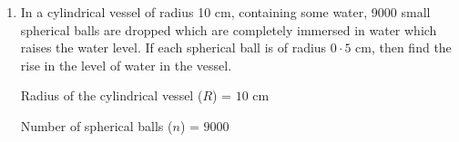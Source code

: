 \begin{enumerate}[label=\thesubsection.\arabic*, ref=\thesubsection.\theenumi]
	
	
	\begin{enumerate}
		\item Find $\frac{N}{2}$:
		\begin{center}
		$\frac{N}{2} = \frac{45}{2} = 22.5$
		\end{center}
		\item The cumulative frequency just greater than $22.5$ is $28$, which corresponds to the median class \textbf{100--140}.
		\item Values for the formula:
		\begin{itemize}
			\item Lower limit of median class ($l$) = $100$
			
			\item Cumulative frequency of preceding class ($cf$) = $12$
			
			\item Frequency of median class ($f$) = $16$
			
			\item Class width ($h$) = $40$
		\end{itemize}
	\end{enumerate}
	
	Apply the Median formula:
	\begin{align}
	\text{Median} = l + \left( \frac{\frac{N}{2} - cf}{f} \right) \times h
	\end{align}
	\begin{align}	
	\text{Median} = 100 + \left( \frac{22.5 - 12}{16} \right) \times 40
	\end{align}
	$$
	\text{Median} = 100 + \left( \frac{10.5}{16} \right) \times 40 = 100 + \frac{10.5 \times 5}{2} = 100 + \frac{52.5}{2} = 100 + 26.25 = 126.25
	$$
	 \textbf{Mean:} $125.33$ wickets
	 
	 \textbf{Median:} $126.25$ wickets
	
	
	
	
	\item In a cylindrical vessel of radius 10 cm, containing some water, 9000 small spherical balls are dropped which are completely immersed in water which raises the water level. If each spherical ball is of radius $0\cdot5\text{ cm}$, then find the rise in the level of water in the vessel.
	
	\solution
	
	

		Radius of the cylindrical vessel ($R$) = $10\text{ cm}$
		
		Number of spherical balls ($n$) = $9000$
		

\end{enumerate}
